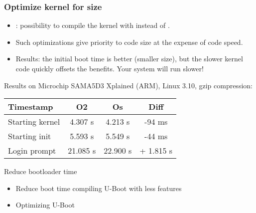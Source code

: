 \begin{frame}
\frametitle{Optimize kernel for size}
\begin{itemize}
\item {}: possibility to compile the kernel
      with  instead of .
\item Such optimizations give priority to code size at
      the expense of code speed.
\item Results: the initial boot time is better (smaller
      size), but the slower kernel code quickly offsets
      the benefits. Your system will run slower!
\end{itemize}
Results on Microchip SAMA5D3 Xplained (ARM), Linux 3.10, gzip compression:
\newline\newline
\begin{tabular}{| l || c | c | c |}
\hline
Timestamp & O2 & Os & Diff \\
\hline
Starting kernel & 4.307 s & 4.213 s & -94 ms \\
Starting init & 5.593 s & 5.549 s & -44 ms \\
Login prompt & 21.085 s & 22.900 s & + 1.815 s \\
\hline
\end{tabular}
\newline\newline
\small
\end{frame}

\setuplabframe
{Reduce bootloader time}
{
\begin{itemize}
\item Reduce boot time compiling U-Boot with less features
\item Optimizing U-Boot
\end{itemize}
}

